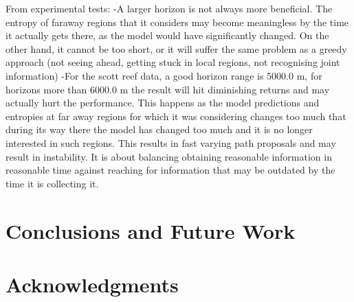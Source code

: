 \documentclass{article}
\begin{document}
		From experimental tests:
			-A larger horizon is not always more beneficial. The entropy of faraway regions that it considers may become meaningless by the time it actually gets there, as the model would have significantly changed. On the other hand, it cannot be too short, or it will suffer the same problem as a greedy approach (not seeing ahead, getting stuck in local regions, not recognising joint information)
			-For the scott reef data, a good horizon range is 5000.0 m, for horizons more than 6000.0 m the result will hit diminishing returns and may actually hurt the performance. This happens as the model predictions and entropies at far away regions for which it was considering changes too much that during its way there the model has changed too much and it is no longer interested in such regions. This results in fast varying path proposals and may result in instability. It is about balancing obtaining reasonable information in reasonable time against reaching for information that may be outdated by the time it is collecting it.
			

		
		
\section{Conclusions and Future Work}
\label{Section:Conclusion}

\section*{Acknowledgments}


%
%



\end{document}
